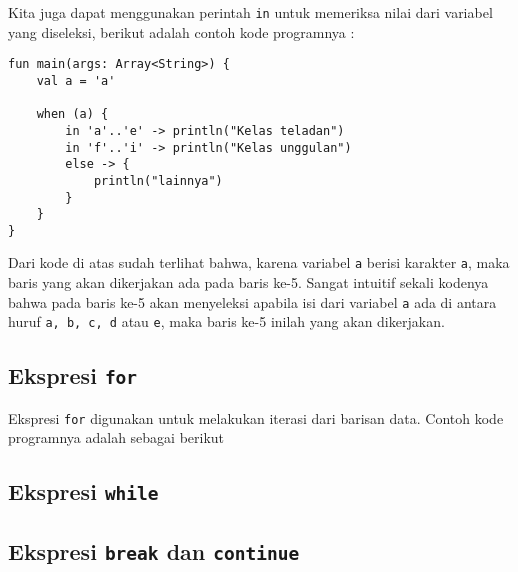 Kita juga dapat menggunakan perintah \texttt{in} untuk memeriksa nilai dari variabel yang diseleksi, berikut adalah contoh kode programnya :

\begin{lstlisting}
fun main(args: Array<String>) {
	val a = 'a'

	when (a) {
		in 'a'..'e' -> println("Kelas teladan")
		in 'f'..'i' -> println("Kelas unggulan")
		else -> {
			println("lainnya")
		}
	}
}
\end{lstlisting}

Dari kode di atas sudah terlihat bahwa, karena variabel \texttt{a} berisi karakter \texttt{a}, maka baris yang akan dikerjakan ada pada baris ke-5. Sangat intuitif sekali kodenya bahwa pada baris ke-5 akan menyeleksi apabila isi dari variabel \texttt{a} ada di antara huruf \texttt{a, b, c, d} atau \texttt{e}, maka baris ke-5 inilah yang akan dikerjakan.

\subsection{Ekspresi \texttt{for}}

Ekspresi \texttt{for} digunakan untuk melakukan iterasi dari barisan data. Contoh kode programnya adalah sebagai berikut 

\subsection{Ekspresi \texttt{while}}

\subsection{Ekspresi \texttt{break} dan \texttt{continue}}

